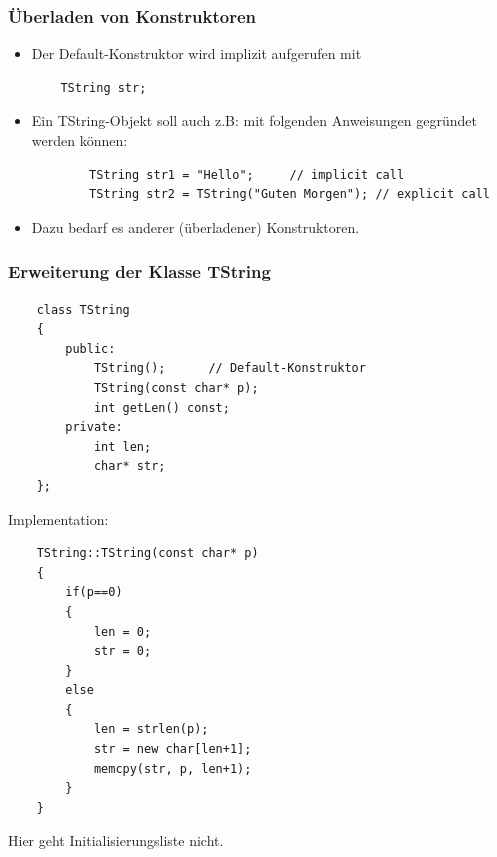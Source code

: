 \subsubsection{Überladen von Konstruktoren}
\label{sec:Überladen von Konstruktoren}
\begin{itemize}
	\item Der Default-Konstruktor wird implizit aufgerufen mit\\
	\begin{lstlisting}
	TString str;
	\end{lstlisting}
	\item Ein TString-Objekt soll auch z.B: mit folgenden Anweisungen gegründet werden können:\\
	\begin{lstlisting}
		TString str1 = "Hello";		// implicit call
		TString str2 = TString("Guten Morgen");	// explicit call
	\end{lstlisting}
	\item Dazu bedarf es anderer (überladener) Konstruktoren.
\end{itemize}

\subsubsection{Erweiterung der Klasse TString}
\label{sec:Erweiterung der Klasse TString}
\noindent
\begin{minipage}{\linewidth}
	\begin{lstlisting}
	class TString
	{
		public:
			TString();		// Default-Konstruktor
			TString(const char* p);
			int getLen() const;
		private:
			int len;
			char* str;
	};
	\end{lstlisting}
\end{minipage}
Implementation:
\noindent
\begin{minipage}{\linewidth}
	\begin{lstlisting}
	TString::TString(const char* p)
	{
		if(p==0)
		{
			len = 0;
			str = 0;
		}
		else
		{
			len = strlen(p);
			str = new char[len+1];
			memcpy(str, p, len+1);
		}
	}
	\end{lstlisting}
\end{minipage}
\begin{hinweis}
	Hier geht Initialisierungsliste nicht.
\end{hinweis}

